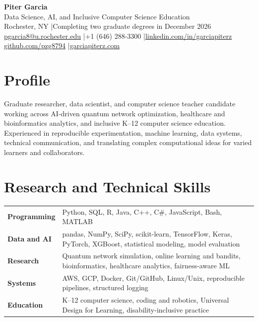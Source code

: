 \documentclass[10pt,letterpaper]{article}
\begin{document}
\fontsize{9}{10.4}\selectfont

\begin{center}
  {\Large\bfseries Piter Garcia}\\[1pt]
  {\large Data Science, AI, and Inclusive Computer Science Education}\\[2pt]
  Rochester, NY \enspace|\enspace Completing two graduate degrees in December 2026\\
  \href{mailto:pgarcia8@u.rochester.edu}{pgarcia8@u.rochester.edu}
  \enspace|\enspace +1 (646) 288-3300
  \enspace|\enspace \href{https://linkedin.com/in/garciapiterz}{linkedin.com/in/garciapiterz}\\
  \href{https://github.com/pzg8794}{github.com/pzg8794}
  \enspace|\enspace \href{https://garciapiterz.com}{garciapiterz.com}
\end{center}

\section*{Profile}
Graduate researcher, data scientist, and computer science teacher candidate
working across AI-driven quantum network optimization, healthcare and
bioinformatics analytics, and inclusive K--12 computer science education.
Experienced in reproducible experimentation, machine learning, data systems,
technical communication, and translating complex computational ideas for
varied learners and collaborators.

\section*{Research and Technical Skills}
\begin{tabularx}{\textwidth}{@{}>{\bfseries}l X@{}}
Programming & Python, SQL, R, Java, C++, C\#, JavaScript, Bash, MATLAB\\
Data and AI & pandas, NumPy, SciPy, scikit-learn, TensorFlow, Keras, PyTorch, XGBoost, statistical modeling, model evaluation\\
Research & Quantum network simulation, online learning and bandits, bioinformatics, healthcare analytics, fairness-aware ML\\
Systems & AWS, GCP, Docker, Git/GitHub, Linux/Unix, reproducible pipelines, structured logging\\
Education & K--12 computer science, coding and robotics, Universal Design for Learning, disability-inclusive practice\\
\end{tabularx}
\end{document}
